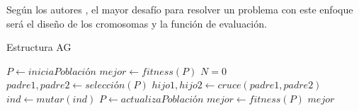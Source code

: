 Según los autores \cite{Lin2020AScheduling}\cite{Goldberg1989GeneticLearning}, el mayor desafío para resolver un problema con este enfoque será el diseño de los cromosomas y la función de evaluación.

\begin{algorithm}
\caption{Estructura AG}\label{alg:ag}
\begin{algorithmic}
\State $P \gets iniciaPoblación$
\State $mejor \gets fitness(P)$
\State $N = 0$
\State $padre1,padre2 \gets selección(P)$
\State $hijo1,hijo2 \gets cruce(padre1,padre2)$
\EndIf
{}
\State $ind \gets mutar(ind)$
\EndIf
\State $P \gets actualizaPoblación$
\State $mejor \gets fitness(P)$
\EndWhile
\State \Return $mejor$
\end{algorithmic}
\end{algorithm}

